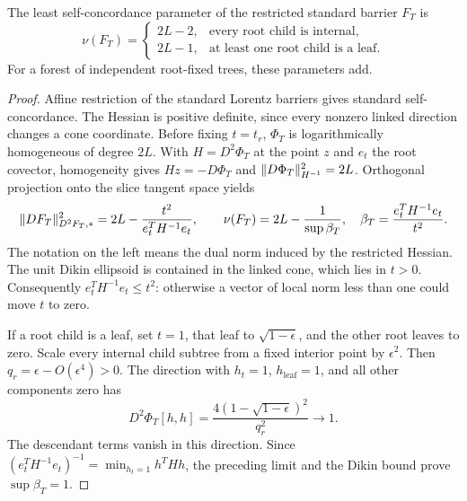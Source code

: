 \begin{theorem}\label{thm:tree-parameter}
The least self-concordance parameter of the restricted standard barrier
$F_T$ is
\begin{equation}\label{eq:tree-parameter-concrete}
 \nu(F_T)=
 \begin{cases}
  2L-2,&\text{every root child is internal},\\
  2L-1,&\text{at least one root child is a leaf}.
 \end{cases}
\end{equation}
For a forest of independent root-fixed trees, these parameters add.
\end{theorem}
\begin{proof}
Affine restriction of the standard Lorentz barriers gives standard
self-concordance.  The Hessian is positive definite, since every
nonzero linked direction changes a cone coordinate.  Before fixing
$t=t_r$, $\Phi_T$ is logarithmically homogeneous of degree $2L$.  With
$H=D^2\Phi_T$ at the point $z$ and $e_t$ the root covector, homogeneity
gives
$Hz=-D\Phi_T$ and $\lVert D\Phi_T\rVert_{H^{-1}}^2=2L$.
Orthogonal projection onto the slice tangent space yields
\begin{equation}\label{eq:tree-root-leverage}
 \lVert DF_T\rVert_{D^2F_T,*}^2
 =2L-\frac{t^2}{e_t^TH^{-1}e_t},\qquad
 \nu(F_T)=2L-\frac1{\sup\beta_T},\quad
 \beta_T=\frac{e_t^TH^{-1}e_t}{t^2}.
\end{equation}
The notation on the left means the dual norm induced by the restricted
Hessian.  The unit Dikin ellipsoid is contained in the linked cone,
which lies in $t>0$.  Consequently $e_t^TH^{-1}e_t\leq t^2$:
otherwise a vector of local norm less than one could move $t$ to zero.

If a root child is a leaf, set $t=1$, that leaf to $\sqrt{1-\epsilon}$,
and the other root leaves to zero.  Scale every internal child subtree
from a fixed interior point by $\epsilon^2$.  Then
$q_r=\epsilon-O(\epsilon^4)>0$.  The direction with $h_t=1$,
$h_{\mathrm{leaf}}=1$, and all other components zero has
\[
 D^2\Phi_T[h,h]
 =\frac{4(1-\sqrt{1-\epsilon})^2}{q_r^2}\longrightarrow1.
\]
The descendant terms vanish in this direction.  Since
$(e_t^TH^{-1}e_t)^{-1}=\min_{h_t=1}h^THh$, the preceding limit
and the Dikin bound prove $\sup\beta_T=1$.


\end{proof}
